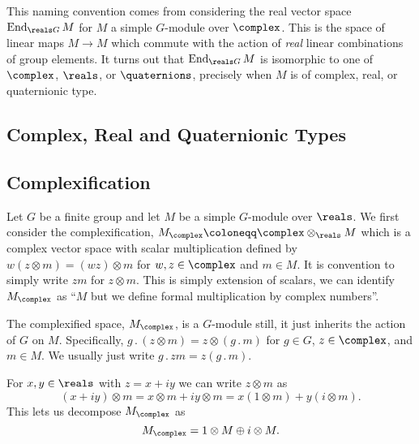 \documentclass[fleqn]{NotesClass}
\DeclareMathOperator{\End}{End}
\newcommand{\action}{\mathbin{.}}
\begin{document}
    This naming convention comes from considering the real vector space \(\End_{\reals G}M\) for \(M\) a simple \(G\)-module over \(\complex\).
    This is the space of linear maps \(M \to M\) which commute with the action of \emph{real} linear combinations of group elements.
    It turns out that \(\End_{\reals G}M\) is isomorphic to one of \(\complex\), \(\reals\), or \(\quaternions\), precisely when \(M\) is of complex, real, or quaternionic type.
    
    
    
	\appendixpage
	\begin{appendices}
	    \chapter{Complex, Real and Quaternionic Types}
        \section{Complexification}
        Let \(G\) be a finite group and let \(M\) be a simple \(G\)-module over \(\reals\).
        We first consider the complexification, \(M_{\complex} \coloneqq \complex \otimes_{\reals} M\) which is a complex vector space with scalar multiplication defined by \(w(z \otimes m) = (wz) \otimes m\) for \(w, z \in \complex\) and \(m \in M\).
        It is convention to simply write \(zm\) for \(z \otimes m\).
        This is simply extension of scalars, we can identify \(M_{\complex}\) as \enquote{\(M\) but we define formal multiplication by complex numbers}.
        
        The complexified space, \(M_{\complex}\), is a \(G\)-module still, it just inherits the action of \(G\) on \(M\).
        Specifically, \(g \action (z \otimes m) = z \otimes (g \action m)\) for \(g \in G\), \(z \in \complex\), and \(m \in M\).
        We usually just write \(g \action zm = z(g \action m)\).
        
        For \(x, y \in \reals\) with \(z = x + iy\) we can write \(z \otimes m\) as
        \begin{equation}
            (x + iy) \otimes m = x \otimes m + iy \otimes m = x (1 \otimes m) + y (i \otimes m).
        \end{equation}
        This lets us decompose \(M_{\complex}\) as
        \begin{equation}
            M_{\complex} = 1 \otimes M \oplus i \otimes M.
        \end{equation}
        
	\end{appendices}

    \backmatter
    \renewcommand{\glossaryname}{Acronyms}
    \printglossary[acronym]
    \printindex
\end{document}
